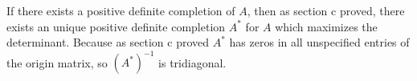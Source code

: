 \message{ !name(ass3_ChangLi.tex)}\documentclass[10pt,a4paper]{article}
\begin{document}

If there exists a positive definite completion of $A$, then as
section c proved, there exists an unique positive definite
completion $A^*$ for $A$ which maximizes the determinant.
Because as section c proved $A^*$ has zeros in all
unspecified entries of the origin matrix, so $(A^*)^{-1}$ is tridiagonal.




\end{document}
